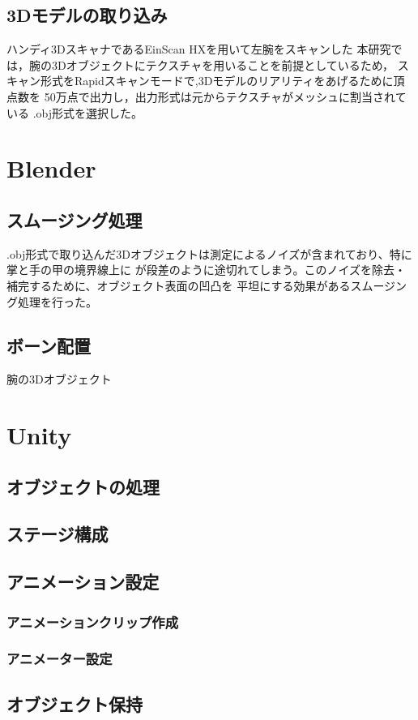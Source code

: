 \documentclass{ltjsreport}
\begin{document}
		\subsection{3Dモデルの取り込み}
			ハンディ3DスキャナであるEinScan HXを用いて左腕をスキャンした
			本研究では，腕の3Dオブジェクトにテクスチャを用いることを前提としているため，
			スキャン形式をRapidスキャンモードで,3Dモデルのリアリティをあげるために頂点数を
			50万点で出力し，出力形式は元からテクスチャがメッシュに割当されている
			.obj形式を選択した。
	\section{Blender}
		\subsection{スムージング処理}
			.obj形式で取り込んだ3Dオブジェクトは測定によるノイズが含まれており、特に掌と手の甲の境界線上に
			が段差のように途切れてしまう。このノイズを除去・補完するために、オブジェクト表面の凹凸を
			平坦にする効果があるスムージング処理を行った。
		\subsection{ボーン配置}
			腕の3Dオブジェクト
	\section{Unity}
		\subsection{オブジェクトの処理}
		\subsection{ステージ構成}
		\subsection{アニメーション設定}
			\subsubsection{アニメーションクリップ作成}
			\subsubsection{アニメーター設定}
		\subsection{オブジェクト保持}
	
\end{document}
